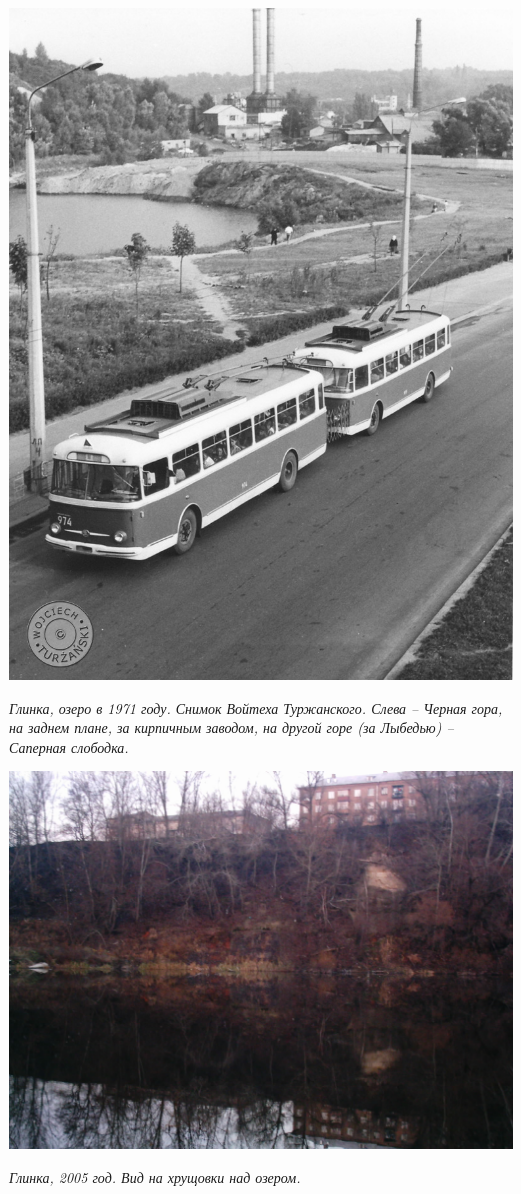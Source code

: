 \begin{center}
\includegraphics[width=\linewidth]{rpix/1973.jpg}

\textit{Глинка, озеро в 1971 году. Снимок Войтеха Туржанского. Слева – Черная гора, на заднем плане, за кирпичным заводом, на другой горе (за Лыбедью) – Саперная слободка.}
\end{center}

\newpage


\begin{center}
\includegraphics[width=\linewidth]{rpix/imag0025.jpg}

\textit{Глинка, 2005 год. Вид на хрущовки над озером.}
\end{center}



